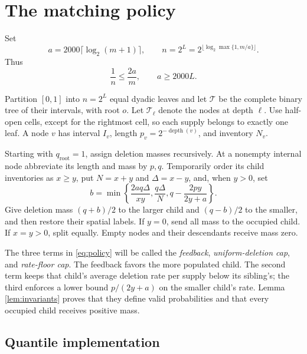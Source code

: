 \documentclass[11pt]{article}
\numberwithin{equation}{section}
\theoremstyle{remark}
\newcommand{\T}{\mathcal T}
\newcommand{\depth}{\operatorname{depth}}
\begin{document}
\section{The matching policy}\label{sec:policy}

Set
\begin{equation}\label{eq:parameters}
a=2000\lceil\log_2(m+1)\rceil,\qquad
n=2^L=2^{\lfloor\log_2\max\{1,m/a\}\rfloor}.
\end{equation}
Thus
\begin{equation}\label{eq:parameter-bounds}
\frac1n\le\frac{2a}{m},\qquad a\ge2000L.
\end{equation}


Partition \([0,1]\) into \(n=2^L\) equal dyadic leaves and let \(\T\)
be the complete binary tree of their intervals, with root \(o\).
Let \(\T_\ell\) denote the nodes at depth \(\ell\). Use half-open cells,
except for the rightmost cell, so each supply belongs to exactly one leaf.
A node \(v\) has interval
\(I_v\), length \(p_v=2^{-\depth(v)}\), and inventory \(N_v\).

Starting with \(q_{\mathrm{root}}=1\), assign deletion masses recursively.
At a nonempty internal node abbreviate its length and mass by \(p,q\).
Temporarily order its child inventories as \(x\ge y\), put
\(N=x+y\) and \(\Delta=x-y\), and, when \(y>0\), set
\begin{equation}\label{eq:policy}
b=\min\left\{
\frac{2aq\Delta}{xy},
\frac{q\Delta}{N},
q-\frac{2py}{2y+a}
\right\}.
\end{equation}
Give deletion mass \((q+b)/2\) to the larger child and \((q-b)/2\) to
the smaller, and then restore their spatial labels. If \(y=0\), send all
mass to the occupied child. If \(x=y>0\), split equally. Empty nodes and
their descendants receive mass zero.

The three terms in \eqref{eq:policy} will be called the \emph{feedback},
\emph{uniform-deletion cap}, and \emph{rate-floor cap}. The feedback
favors the more populated child. The second term keeps that child's
average deletion rate per supply below its sibling's; the third enforces
a lower bound \(p/(2y+a)\) on the smaller child's rate. Lemma
\ref{lem:invariants} proves that they define valid probabilities and that
every occupied child receives positive mass.

\subsection{Quantile implementation}
\end{document}
